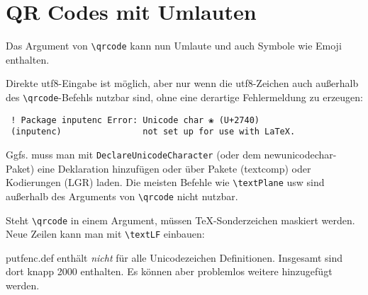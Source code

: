 \documentclass[parskip=full-]{scrartcl}
\begin{document}
\section{QR Codes mit Umlauten}

 Das Argument von \verb+\qrcode+ kann nun Umlaute und auch Symbole wie Emoji enthalten.

 Direkte utf8-Eingabe  ist möglich, aber nur wenn die utf8-Zeichen auch außerhalb des \verb+\qrcode+-Befehls nutzbar sind, ohne  eine derartige Fehlermeldung zu erzeugen:

 \begin{verbatim}
 ! Package inputenc Error: Unicode char ❀ (U+2740)
 (inputenc)                not set up for use with LaTeX.
 \end{verbatim}

 Ggfs. muss man mit \verb+DeclareUnicodeCharacter+ (oder dem newunicodechar-Paket) eine Deklaration hinzufügen oder über Pakete (textcomp) oder Kodierungen (LGR) laden.
 Die meisten Befehle wie \verb+\textPlane+ usw sind außerhalb des Arguments von \verb+\qrcode+ nicht nutzbar.


%



 \bigskip

 Steht \verb+\qrcode+ in einem Argument, müssen \TeX-Sonderzeichen maskiert werden. Neue Zeilen kann man mit \verb+\textLF+ einbauen:

%


putfenc.def enthält \emph{nicht} für alle Unicodezeichen Definitionen. Insgesamt sind dort knapp 2000 enthalten. Es können aber problemlos weitere hinzugefügt werden.
\end{document}

